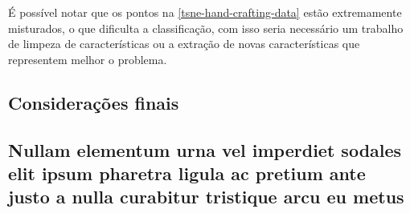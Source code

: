 \documentclass[
article,			%
11pt,				%
oneside,			%
a4paper,			%
english,			%
brazil,				%
sumario=tradicional,
]{abntex2}
\begin{document}
	É possível notar que os pontos na \autoref{tsne-hand-crafting-data} estão extremamente misturados, o que dificulta a classificação, com isso seria necessário um trabalho de limpeza de características ou a extração de novas características que representem melhor o problema.
	
	\section{Considerações finais}
	
	\postextual
	
	
	
	
	
	\begin{apendicesenv}
		
		\chapter{Nullam elementum urna vel imperdiet sodales elit ipsum pharetra ligula
			ac pretium ante justo
		 a nulla curabitur tristique arcu eu metus}
		\lipsum[55-56]
		
	\end{apendicesenv}
	
\end{document}
